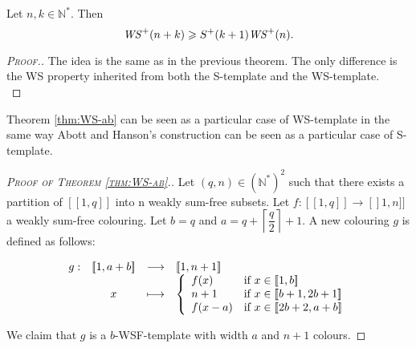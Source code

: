 \begin{corollary}
Let \(n, k \in \mathbb{N}^*\). Then
\[
\mathit{WS}^+(n+k) \geqslant S^+(k+1) \mathit{WS}^+(n).
\]
\end{corollary}

\begin{proof}[\textsc{Proof.}]
The idea is the same as in the previous theorem. The only difference is the WS property inherited
from both the S-template and the WS-template. \\
\end{proof}

Theorem \ref{thm:WS-ab} can be seen as a particular case of WS-template in the same way Abott and Hanson's 
construction \cite{AbbottHanson} can be seen as a particular case of S-template.

\begin{proof}[\textsc{Proof of Theorem \ref{thm:WS-ab}.}]
\label{PreuveThm}
Let \((q, n) \in (\mathbb{N}^*)^2\) such that there exists a partition of \([\![1, q]\!]\) into n weakly sum-free subsets. 
Let \(f: [\![1, q]\!] \rightarrow [\!]1, n]\!]\) a weakly sum-free colouring.
Let \(b=q\) and \(a = q + \left \lceil \dfrac{q}{2} \right \rceil + 1\). A new colouring \(g\) is defined as follows:

\[
\begin{array}{c c c l}
	g : & [\![1, a + b]\!] & \longrightarrow & [\![1, n + 1]\!] \\
	& x & \longmapsto &
		\left\{ \begin{array}{l l}
			f(x) & \text{if}~x \in [\![1, b]\!]  \\
			n + 1 & \text{if}~x \in [\![b + 1, 2 b + 1]\!] \\
			f(x - a) & \text{if}~x \in  [\![2 b + 2, a + b]\!]
		\end{array} \right.
\end{array}
\]

We claim that \(g\) is a \(b\)-WSF-template with width \(a\) and \(n + 1\) colours.


\end{proof}
